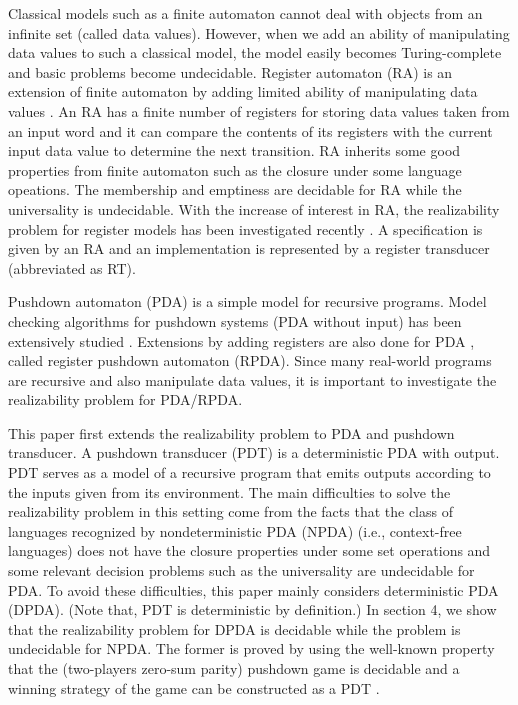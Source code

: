 Classical models such as a finite automaton cannot deal with
objects from an infinite set (called data values).
However, when we add an ability of manipulating data values to such a classical model,
the model easily becomes Turing-complete and basic problems become undecidable.
Register automaton (RA) is an extension of finite automaton by adding limited ability of
manipulating data values \cite{KF94,NSV04,Se06}.
An RA has a finite number of registers for storing data values taken from an input word and
it can compare the contents of its registers with the current input data value
to determine the next transition.
RA inherits some good properties from finite automaton such as the closure under some
language opeations.
The membership and emptiness are decidable for RA while the universality is undecidable.
With the increase of interest in RA, the realizability problem for register models
has been investigated recently \cite{ESK14,KMB18,EFR19,KK19}.
A specification is given by an RA and
an implementation is represented by a register transducer (abbreviated as RT).

Pushdown automaton (PDA) is a simple model for recursive programs.
Model checking algorithms for pushdown systems (PDA without input)
has been extensively studied \cite{Gr67,Wa96,BEM97,EHRS00,EKS01}.
Extensions by adding registers are also done for PDA \cite{CL15,MRT17,STS21},
called register pushdown automaton (RPDA).
Since many real-world programs are recursive and also manipulate data values,
it is important to investigate the realizability problem for PDA/RPDA.
\medskip\par
This paper first extends the realizability problem to PDA and pushdown transducer.
A pushdown transducer (PDT) is a deterministic PDA with output.
PDT serves as a model of a recursive program that emits outputs
according to the inputs given from its environment.
The main difficulties to solve the realizability problem in this setting
come from the facts that
the class of languages recognized by nondeterministic PDA (NPDA) (i.e., context-free languages)
does not have the closure properties under some set operations and
some relevant decision problems such as the universality are undecidable for PDA.
To avoid these difficulties, this paper mainly considers deterministic PDA (DPDA).
(Note that, PDT is deterministic by definition.)
In section 4, we show that the realizability problem for DPDA is decidable
while the problem is undecidable for NPDA.
The former is proved by using the well-known property that
the (two-players zero-sum parity) pushdown game is decidable and
a winning strategy of the game can be constructed as a PDT \cite{Wa96}.

